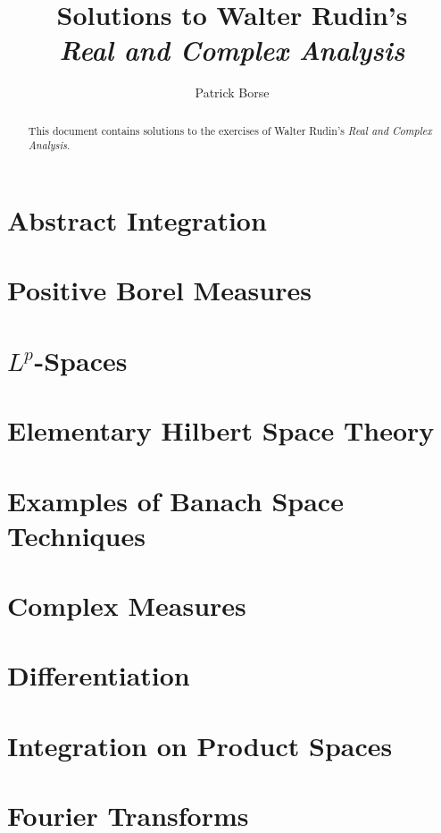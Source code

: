 \documentclass[oneside]{amsbook}
\title{Solutions to Walter Rudin's\\ \emph{Real and Complex Analysis}}
\author{Patrick Borse}
\numberwithin{ex}{chapter}
\begin{document}
\begin{abstract}
This document contains solutions to the exercises of Walter Rudin's \emph{Real and Complex Analysis}. 
\end{abstract}

\maketitle

\tableofcontents

\chapter{Abstract Integration}


\chapter{Positive Borel Measures}


\chapter{$L^p$-Spaces}


\chapter{Elementary Hilbert Space Theory}


\chapter{Examples of Banach Space Techniques}


\chapter{Complex Measures}


\chapter{Differentiation}


\chapter{Integration on Product Spaces}


\chapter{Fourier Transforms}

\end{document}
